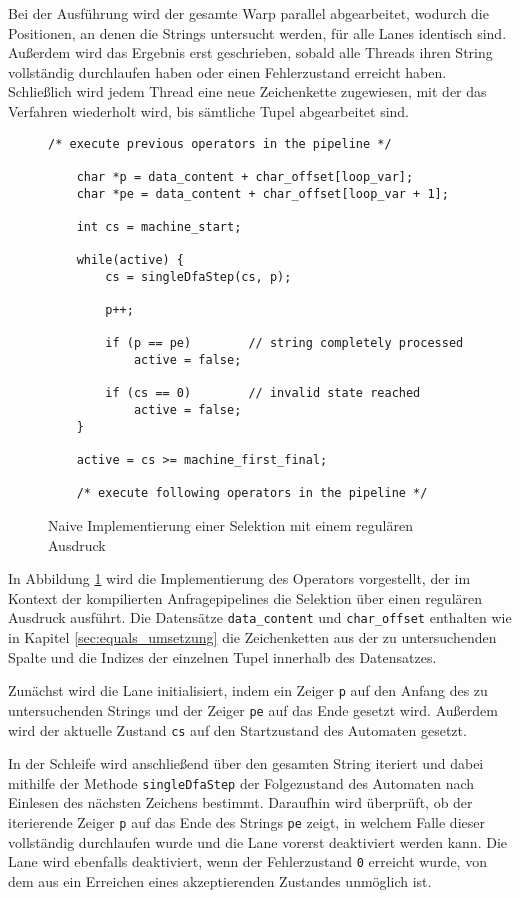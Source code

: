 Bei der Ausführung wird der gesamte Warp parallel abgearbeitet, wodurch die Positionen, an denen die Strings untersucht werden, für alle Lanes identisch sind.
Außerdem wird das Ergebnis erst geschrieben, sobald alle Threads ihren String vollständig durchlaufen haben oder einen Fehlerzustand erreicht haben.
Schließlich wird jedem Thread eine neue Zeichenkette zugewiesen, mit der das Verfahren wiederholt wird, bis sämtliche Tupel abgearbeitet sind.

\begin{figure}[ht]
	\begin{lstlisting}[language=MyC++]
	/* execute previous operators in the pipeline */
	
	char *p = data_content + char_offset[loop_var];
	char *pe = data_content + char_offset[loop_var + 1];
	
	int cs = machine_start;
	
	while(active) {
		cs = singleDfaStep(cs, p);
		
		p++;
		
		if (p == pe)		// string completely processed
			active = false;
		
		if (cs == 0)		// invalid state reached
			active = false;
	}
	
	active = cs >= machine_first_final;
	
	/* execute following operators in the pipeline */
	\end{lstlisting}
	\caption{Naive Implementierung einer Selektion mit einem regulären Ausdruck}
	\label{naive_regex}
\end{figure}

In Abbildung \ref{naive_regex} wird die Implementierung des Operators vorgestellt, der im Kontext der kompilierten Anfragepipelines die Selektion über einen regulären Ausdruck ausführt.
Die Datensätze \texttt{data\_content} und \texttt{char\_offset} enthalten wie in Kapitel \ref{sec:equals_umsetzung} die Zeichenketten aus der zu untersuchenden Spalte und die Indizes der einzelnen Tupel innerhalb des Datensatzes.

Zunächst wird die Lane initialisiert, indem ein Zeiger \texttt{p} auf den Anfang des zu untersuchenden Strings und der Zeiger \texttt{pe} auf das Ende gesetzt wird.
Außerdem wird der aktuelle Zustand \texttt{cs} auf den Startzustand des Automaten gesetzt.

In der Schleife wird anschließend über den gesamten String iteriert und dabei mithilfe der Methode \texttt{singleDfaStep} der Folgezustand des Automaten nach Einlesen des nächsten Zeichens bestimmt.
Daraufhin wird überprüft, ob der iterierende Zeiger \texttt{p} auf das Ende des Strings \texttt{pe} zeigt, in welchem Falle dieser vollständig durchlaufen wurde und die Lane vorerst deaktiviert werden kann.
Die Lane wird ebenfalls deaktiviert, wenn der Fehlerzustand \texttt{0} erreicht wurde, von dem aus ein Erreichen eines akzeptierenden Zustandes unmöglich ist.

